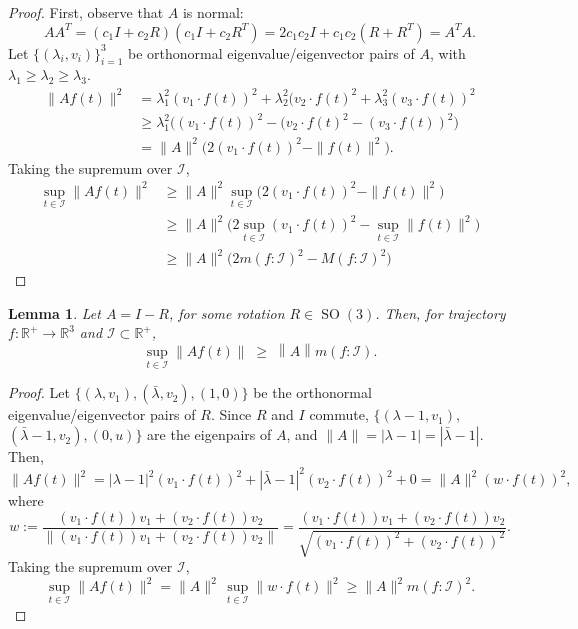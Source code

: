 \documentclass[]{article}
\newtheorem{lemma}{Lemma}
\def\RR{\mathbb{R}}
\def\subs{\subset}
\def\SO{\operatorname{SO}}
\def\m{{m}}
\def\M{{M}}
\def\I{\mathcal{I}}
\begin{document}
\begin{proof}
First, observe that $A$ is normal:
$$AA^T = (c_1I + c_2R)(c_1I + c_2R^T) = 2c_1c_2I + c_1c_2(R + R^T)
= A^TA.$$
Let $\{(\lambda_i, v_i)\}_{i=1}^3$ be orthonormal eigenvalue/eigenvector pairs of $A$, with $\lambda_1\geq\lambda_2\geq\lambda_3$.
\begin{align*}
\|A f(t)\|^2 &= \lambda_1^2(v_1\cdot f(t))^2 + \lambda_2^2(v_2\cdot f(t)^2 + \lambda_3^2(v_3\cdot f(t))^2\\
&\geq \lambda_1^2\bigl((v_1\cdot f(t))^2 - (v_2\cdot f(t)^2 - (v_3\cdot f(t))^2\bigr)\\
&=\|A\|^2\bigl(2(v_1\cdot f(t))^2 - \|f(t)\|^2\bigr).
\end{align*}
Taking the supremum over $\I$,
\begin{align*}
\sup_{t\in\I}\|A f(t)\|^2 &\geq \|A\|^2\sup_{t\in\I}\bigl(2(v_1\cdot f(t))^2 - \|f(t)\|^2\bigr)\\
&\geq \|A\|^2\bigl(2\sup_{t\in\I}(v_1\cdot f(t))^2 - \sup_{t\in\I}\|f(t)\|^2\bigr)\\
&\geq \|A\|^2\bigl(2\m(f\!:\!\I)^2 - \M(f\!:\!\I)^2\bigr)
\end{align*}
\end{proof}

\begin{lemma}
Let $A = I-R$, for some rotation $R\in\SO(3)$.
Then, for trajectory $f:\RR^+\to\RR^3$ and $\I\subs\RR^+$,
$$\sup_{t\in \I} \left\|A f(t)\right\| \;\geq\;
\left\|A\right\|\m(f\!:\!\I).
$$
\end{lemma}
\begin{proof}
Let $\{(\lambda, v_1), (\bar\lambda, v_2), (1,0)\}$ be the orthonormal eigenvalue/eigenvector pairs of $R$.
Since $R$ and $I$ commute, $\{(\lambda-1, v_1),$ $(\bar\lambda-1, v_2), (0, u)\}$ are the eigenpairs of $A$, 
and $\|A\|=|\lambda-1| = |\bar\lambda-1|$. Then,
$$\|Af(t)\|^2 = |\lambda-1|^2(v_1\cdot f(t))^2 + |\bar\lambda-1|^2(v_2\cdot f(t))^2 + 0
= \|A\|^2(w\cdot f(t))^2,
$$
where 
$$w 
:= \frac{(v_1\cdot f(t)) v_1 + (v_2\cdot f(t)) v_2}{\|(v_1\cdot f(t)) v_1 + (v_2\cdot f(t)) v_2\|}
= \frac{(v_1\cdot f(t)) v_1 + (v_2\cdot f(t)) v_2}{\sqrt{(v_1\cdot f(t))^2 + (v_2\cdot f(t))^2}}.
$$
Taking the supremum over $\I$,
$$\sup_{t\in\I}\|Af(t)\|^2  = \|A\|^2\,\sup_{t\in\I}\|w\cdot f(t)\|^2 \geq \|A\|^2\m(f\!:\I)^2.$$
\end{proof}
\end{document}
